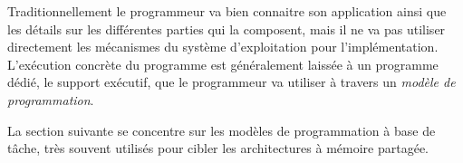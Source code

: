 Traditionnellement le programmeur va bien connaitre son application ainsi que les détails sur les différentes parties qui la composent, mais il ne va pas utiliser directement les mécanismes du système d'exploitation pour l'implémentation.
L'exécution concrète du programme est généralement laissée à un programme dédié, le support exécutif, que le programmeur va utiliser à travers un \emph{modèle de programmation}.

La section suivante se concentre sur les modèles de programmation à base de tâche, très souvent utilisés pour cibler les architectures à mémoire partagée.
